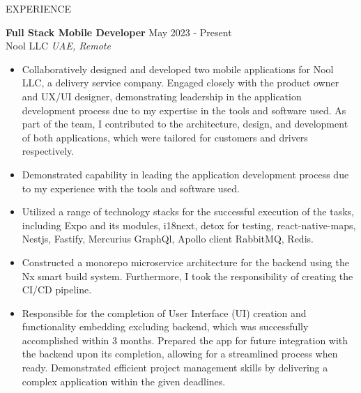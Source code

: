 \documentclass{resume} %
\begin{document}
\begin{rSection}{EXPERIENCE}

\textbf{Full Stack Mobile Developer} \hfill May 2023 - Present\\
Nool LLC \hfill \textit{UAE, Remote}
 \begin{itemize}
    \itemsep -3pt {} 
        \item Collaboratively designed and developed two mobile applications for Nool LLC, a delivery service company. Engaged closely with the product owner and UX/UI designer, demonstrating leadership in the application development process due to my expertise in the tools and software used. As part of the team, I contributed to the architecture, design, and development of both applications, which were tailored for customers and drivers respectively.
        \item Demonstrated capability in leading the application development process due to my experience with the tools and software used.
        \item Utilized a range of technology stacks for the successful execution of the tasks, including Expo and its modules, i18next, detox for testing, react-native-maps, Nestjs, Fastify, Mercurius GraphQl, Apollo client RabbitMQ, Redis.
        \item Constructed a monorepo microservice architecture for the backend using the Nx smart build system. Furthermore, I took the responsibility of creating the CI/CD pipeline. 
        \item Responsible for the completion of User Interface (UI) creation and functionality embedding excluding backend, which was successfully accomplished within 3 months. Prepared the app for future integration with the backend upon its completion, allowing for a streamlined process when ready. Demonstrated efficient project management skills by delivering a complex application within the given deadlines.
 \end{itemize}


\end{rSection}
\end{document}
